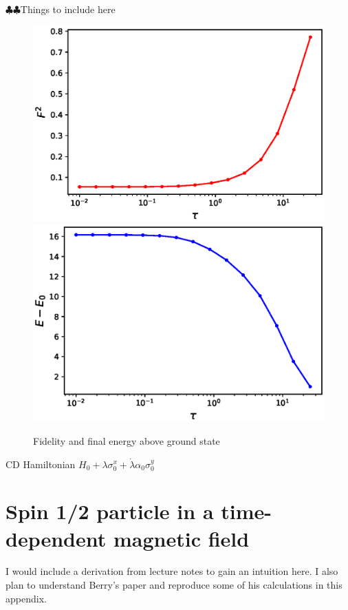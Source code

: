 \documentclass[11pt,a4paper]{article}
\begin{document}
$\clubsuit \clubsuit $Things to include here \\


\begin{figure}
\centering
\includegraphics[scale=0.5]{fidelity_naive.eps}
\includegraphics[scale=0.5]{final_energy_naive.eps}
\caption{Fidelity and final energy above ground state}
\end{figure}

CD Hamiltonian $H_0+ \lambda \sigma_0^x + \dot{\lambda} \alpha_0 \sigma_0^y$\\
\appendix

\section{Spin 1/2 particle in a time-dependent magnetic field}
I would include a derivation from lecture notes to gain an intuition here. I also plan to understand Berry's paper and reproduce some of his calculations in this appendix.
\end{document}
